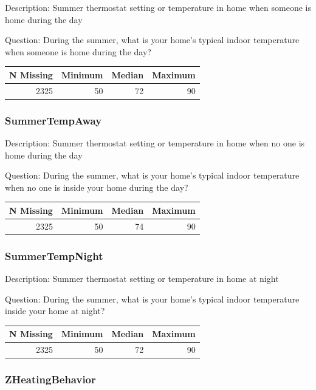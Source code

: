 \documentclass[
]{krantz}
\begin{document}
Description: Summer thermostat setting or temperature in home when someone is home during the day

Question: During the summer, what is your home's typical indoor temperature when someone is home during the day?

\begin{tabular}[t]{r|r|r|r}
\hline
N Missing & Minimum & Median & Maximum\\
\hline
2325 & 50 & 72 & 90\\
\hline
\end{tabular}

\hypertarget{summertempaway}{%
\subsubsection*{SummerTempAway}\label{summertempaway}}


Description: Summer thermostat setting or temperature in home when no one is home during the day

Question: During the summer, what is your home's typical indoor temperature when no one is inside your home during the day?

\begin{tabular}[t]{r|r|r|r}
\hline
N Missing & Minimum & Median & Maximum\\
\hline
2325 & 50 & 74 & 90\\
\hline
\end{tabular}

\hypertarget{summertempnight}{%
\subsubsection*{SummerTempNight}\label{summertempnight}}


Description: Summer thermostat setting or temperature in home at night

Question: During the summer, what is your home's typical indoor temperature inside your home at night?

\begin{tabular}[t]{r|r|r|r}
\hline
N Missing & Minimum & Median & Maximum\\
\hline
2325 & 50 & 72 & 90\\
\hline
\end{tabular}

\hypertarget{zheatingbehavior}{%
\subsubsection*{ZHeatingBehavior}\label{zheatingbehavior}}
\end{document}
